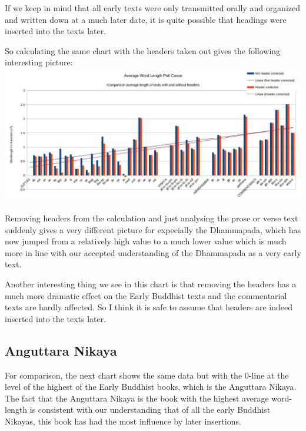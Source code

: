 If we keep in mind that all early texts were only transmitted orally and organized and written down at a much later date, it is quite possible that headings were inserted into the texts later.

So calculating the same chart with the headers taken out gives the following interesting picture:\\

\includegraphics[width=\linewidth]{chart2.jpg}
\label{chart2}

\medskip
Removing headers from the calculation and just analysing the prose or verse text suddenly gives a very different picture for expecially the Dhammapada, which has now jumped from a relatively high value to a much lower value which is much more in line with our accepted understanding of the Dhammapada as a very early text.

Another interesting thing we see in this chart is that removing the headers has a much more dramatic effect on the Early Buddhist texts and the commentarial texts are hardly affected. So I think it is safe to assume that headers are indeed inserted into the texts later.

\subsection{Anguttara Nikaya}
For comparison, the next chart shows the same data but with the 0-line at the level of the highest of the Early Buddhist books, which is the Anguttara Nikaya. The fact that the Anguttara Nikaya is the book with the highest average word-length is consistent with our understanding that of all the early Buddhist Nikayas, this book has had the most influence by later insertions. \\

